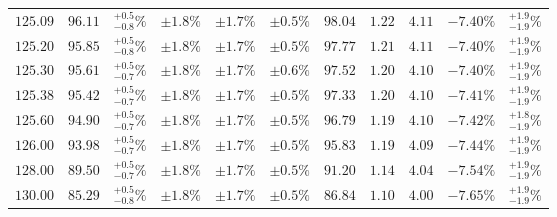 \begin{table}[ht!]
{{\begin{tabular}{| cc | c | ccc | cccc | c |}
$125.09$ & $96.11$ & $^{+0.5}_{-0.8}\%$ & $\pm 1.8\%$ & {\color{black!55}$\pm 1.7\%$} & {\color{black!55}$\pm 0.5\%$} & $98.04$ & $1.22$ & $4.11$ & $-7.40\%$ & $^{+1.9}_{-1.9}\%$ \\
$125.20$ & $95.85$ & $^{+0.5}_{-0.8}\%$ & $\pm 1.8\%$ & {\color{black!55}$\pm 1.7\%$} & {\color{black!55}$\pm 0.5\%$} & $97.77$ & $1.21$ & $4.11$ & $-7.40\%$ & $^{+1.9}_{-1.9}\%$ \\
$125.30$ & $95.61$ & $^{+0.5}_{-0.7}\%$ & $\pm 1.8\%$ & {\color{black!55}$\pm 1.7\%$} & {\color{black!55}$\pm 0.6\%$} & $97.52$ & $1.20$ & $4.10$ & $-7.40\%$ & $^{+1.9}_{-1.9}\%$ \\
$125.38$ & $95.42$ & $^{+0.5}_{-0.7}\%$ & $\pm 1.8\%$ & {\color{black!55}$\pm 1.7\%$} & {\color{black!55}$\pm 0.5\%$} & $97.33$ & $1.20$ & $4.10$ & $-7.41\%$ & $^{+1.9}_{-1.9}\%$ \\
$125.60$ & $94.90$ & $^{+0.5}_{-0.7}\%$ & $\pm 1.8\%$ & {\color{black!55}$\pm 1.7\%$} & {\color{black!55}$\pm 0.5\%$} & $96.79$ & $1.19$ & $4.10$ & $-7.42\%$ & $^{+1.8}_{-1.9}\%$ \\
$126.00$ & $93.98$ & $^{+0.5}_{-0.7}\%$ & $\pm 1.8\%$ & {\color{black!55}$\pm 1.7\%$} & {\color{black!55}$\pm 0.5\%$} & $95.83$ & $1.19$ & $4.09$ & $-7.44\%$ & $^{+1.9}_{-1.9}\%$ \\
$128.00$ & $89.50$ & $^{+0.5}_{-0.7}\%$ & $\pm 1.8\%$ & {\color{black!55}$\pm 1.7\%$} & {\color{black!55}$\pm 0.5\%$} & $91.20$ & $1.14$ & $4.04$ & $-7.54\%$ & $^{+1.9}_{-1.9}\%$ \\
$130.00$ & $85.29$ & $^{+0.5}_{-0.8}\%$ & $\pm 1.8\%$ & {\color{black!55}$\pm 1.7\%$} & {\color{black!55}$\pm 0.5\%$} & $86.84$ & $1.10$ & $4.00$ & $-7.65\%$ & $^{+1.9}_{-1.9}\%$ \\
\cline{1-11}
\end{tabular}
}
}
\end{table}

